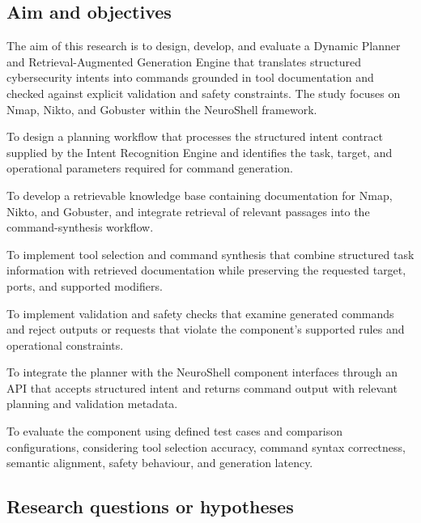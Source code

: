 \documentclass[
]{article}
\begin{document}
\hypertarget{aim-and-objectives}{%
\subsection{Aim and objectives}\label{aim-and-objectives}}

The aim of this research is to design, develop, and evaluate a Dynamic
Planner and Retrieval-Augmented Generation Engine that translates
structured cybersecurity intents into commands grounded in tool
documentation and checked against explicit validation and safety
constraints. The study focuses on Nmap, Nikto, and Gobuster within the
NeuroShell framework.

To design a planning workflow that processes the structured intent
contract supplied by the Intent Recognition Engine and identifies the
task, target, and operational parameters required for command
generation.

To develop a retrievable knowledge base containing documentation for
Nmap, Nikto, and Gobuster, and integrate retrieval of relevant passages
into the command-synthesis workflow.

To implement tool selection and command synthesis that combine
structured task information with retrieved documentation while
preserving the requested target, ports, and supported modifiers.

To implement validation and safety checks that examine generated
commands and reject outputs or requests that violate the component's
supported rules and operational constraints.

To integrate the planner with the NeuroShell component interfaces
through an API that accepts structured intent and returns command output
with relevant planning and validation metadata.

To evaluate the component using defined test cases and comparison
configurations, considering tool selection accuracy, command syntax
correctness, semantic alignment, safety behaviour, and generation
latency.

\hypertarget{research-questions-or-hypotheses}{%
\subsection{Research questions or
hypotheses}\label{research-questions-or-hypotheses}}
\end{document}
